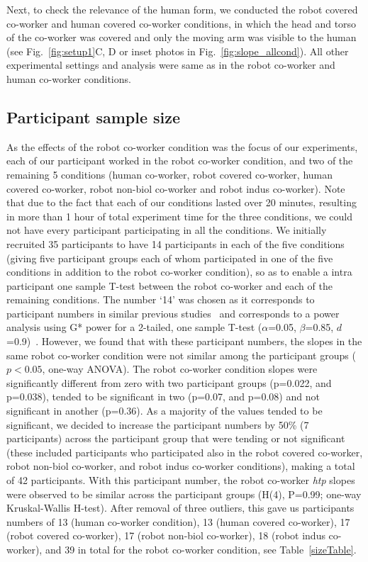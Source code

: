 \documentclass[a4paper, 12pt, oneside]{Thesis}  %
\begin{document}
Next, to check the relevance of the human form, we conducted the robot covered co-worker and human covered co-worker conditions, in which the head and torso of the co-worker was covered and only the moving arm was visible to the human (see Fig.~\ref{fig:setup1}C, D or inset photos in Fig.~\ref{fig:slope_allcond}). All other experimental settings and analysis were same as in the robot co-worker and human co-worker conditions.


\subsection{Participant sample size}

As the effects of the robot co-worker condition was the focus of our experiments, each of our participant worked in the robot co-worker condition, and two of the remaining 5 conditions (human co-worker, robot covered co-worker, human covered co-worker, robot non-biol co-worker and robot indus co-worker). Note that due to the fact that each of our conditions lasted over 20 minutes, resulting in more than 1 hour of total experiment time for the three conditions, we could not have every participant participating in all the conditions. We initially recruited 35 participants to have 14 participants in each of the five conditions (giving five participant groups each of whom participated in one of the five conditions in addition to the robot co-worker condition), so as to enable a intra participant one sample T-test between the robot co-worker and each of the remaining conditions. The number `14' was chosen as it corresponds to participant numbers in similar previous studies~\cite{Bisio:PlosOne:2010,Bisio:PlosOne:2014} and corresponds to a power analysis using G* power for a 2-tailed, one sample T-test ($\alpha$=0.05, $\beta$=0.85, $d$=0.9)~\cite{Erdfelder:JBRMIC:1996, Verma:power_analysis:2017}. However, we found that with these participant numbers, the slopes in the same robot co-worker condition were not similar among the participant groups ($p<0.05$, one-way ANOVA). The robot co-worker condition slopes were significantly different from zero with two participant groups (p=0.022, and p=0.038), tended to be significant in two (p=0.07, and p=0.08) and not significant in another (p=0.36). As a majority of the values tended to be significant, we decided to increase the participant numbers by 50\% (7 participants) across the participant group that were tending or not significant (these included participants who participated also in the robot covered co-worker, robot non-biol co-worker, and robot indus co-worker conditions), making a total of 42 participants. With this participant number, the robot co-worker {\it htp} slopes were observed to be similar across the participant groups (H(4), P=0.99; one-way Kruskal-Wallis H-test). After removal of three outliers, this gave us participants numbers of 13 (human co-worker condition), 13 (human covered co-worker), 17 (robot covered co-worker), 17 (robot non-biol co-worker), 18 (robot indus co-worker), and 39 in total for the robot co-worker condition, see Table~\ref{sizeTable}.
\end{document}
